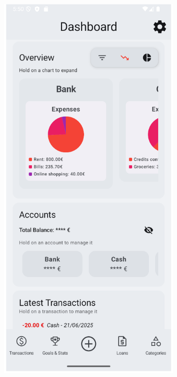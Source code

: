 \documentclass[a4paper,12pt]{article}
\begin{document}
\begin{figure}[H]
    \centering
    \begin{subfigure}[b]{0.23\textwidth}
        \includegraphics[width=\textwidth]{dashboard.png}

\end{subfigure}
\end{figure}
\end{document}
